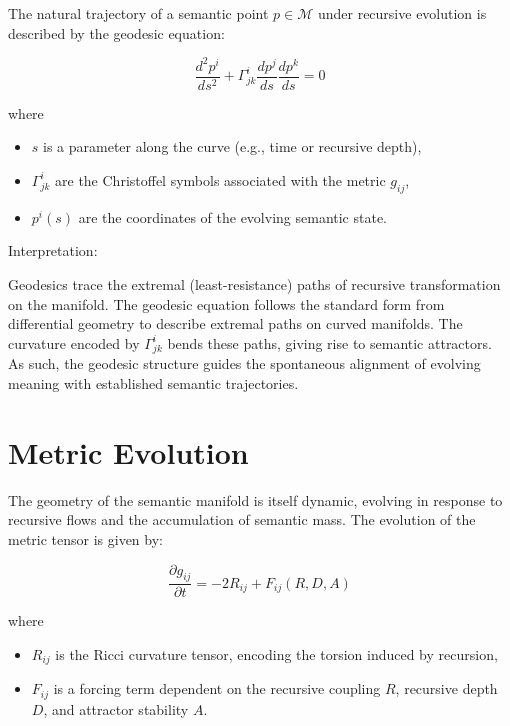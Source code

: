 The natural trajectory of a semantic point \(p \in \mathcal{M}\) under recursive evolution is described by the geodesic equation:

\begin{equation}
\frac{d^2 p^i}{ds^2} + \Gamma^i_{jk} \frac{dp^j}{ds} \frac{dp^k}{ds} = 0
\end{equation}

where
\begin{itemize}
    \item \(s\) is a parameter along the curve (e.g., time or recursive depth),
    \item \(\Gamma^i_{jk}\) are the Christoffel symbols associated with the metric \(g_{ij}\),
    \item \(p^i(s)\) are the coordinates of the evolving semantic state.
\end{itemize}

Interpretation:

Geodesics trace the extremal (least-resistance) paths of recursive transformation on the manifold. The geodesic equation follows the standard form from differential geometry \autocite{doCarmo1992, Einstein1915, MisnerThorneWheeler1973} to describe extremal paths on curved manifolds. The curvature encoded by \(\Gamma^i_{jk}\) bends these paths, giving rise to semantic attractors. As such, the geodesic structure guides the spontaneous alignment of evolving meaning with established semantic trajectories.

\section{Metric Evolution}

The geometry of the semantic manifold is itself dynamic, evolving in response to recursive flows and the accumulation of semantic mass. The evolution of the metric tensor is given by:

\begin{equation}
\frac{\partial g_{ij}}{\partial t} = -2 R_{ij} + F_{ij}(R, D, A)
\end{equation}

where
\begin{itemize}
    \item \(R_{ij}\) is the Ricci curvature tensor, encoding the torsion induced by recursion,
    \item \(F_{ij}\) is a forcing term dependent on the recursive coupling \(R\), recursive depth \(D\), and attractor stability \(A\).
\end{itemize}

